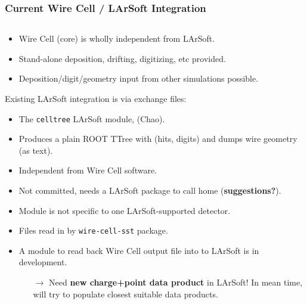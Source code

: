\documentclass[xcolor=dvipsnames]{beamer}
\begin{document}
\begin{frame}
  \frametitle{Current Wire Cell / LArSoft Integration}

  \begin{columns}
    \begin{column}{0.7\paperwidth}
      \scriptsize
      \begin{itemize}
      \item Wire Cell (core) is wholly independent from LArSoft.
      \item Stand-alone deposition, drifting, digitizing, etc provided.
      \item Deposition/digit/geometry input from other simulations possible.
      \end{itemize}

      \vspace{2mm}

      Existing LArSoft integration is via exchange files:
      \begin{itemize}
      \item The \texttt{celltree} LArSoft module, (Chao).
      \item Produces a plain ROOT TTree with (hits, digits) and dumps
        wire geometry (as text).
      \item Independent from Wire Cell software.
      \item Not committed, needs a LArSoft package to call home (\textbf{suggestions?}).
      \item Module is not specific to one LArSoft-supported detector.
      \item Files read in by \texttt{wire-cell-sst} package.
      \item A module to read back Wire Cell output file into to LArSoft is in development.
        \begin{itemize}
          \scriptsize
        \item[$\rightarrow$] Need \textbf{new charge+point data product}
          in LArSoft!
        In mean time, will try to populate closest suitable data products.
        \end{itemize}
      \end{itemize}
      

\end{column}
\end{columns}
\end{frame}
\end{document}
